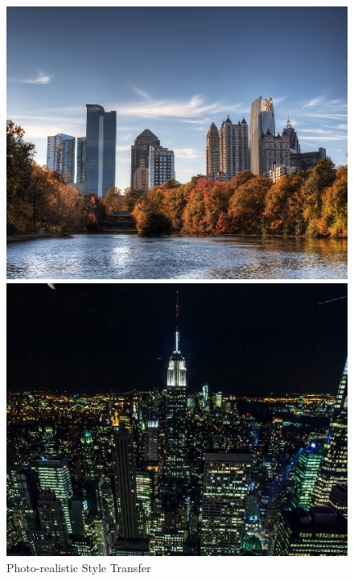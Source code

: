 \documentclass{article}
\begin{document}
\begin{figure}
\centering
\caption{Photo-realistic Style Transfer}
\label{fig:photo-realistic-style-transfer}
    \begin{minipage}{0.3\linewidth}
    \includegraphics[width=\textwidth]{img/photo-transfer/p}
    \end{minipage}
    \begin{minipage}{0.3\linewidth}
    \includegraphics[width=\textwidth]{img/photo-transfer/a}
    \end{minipage}

\end{figure}
\end{document}
